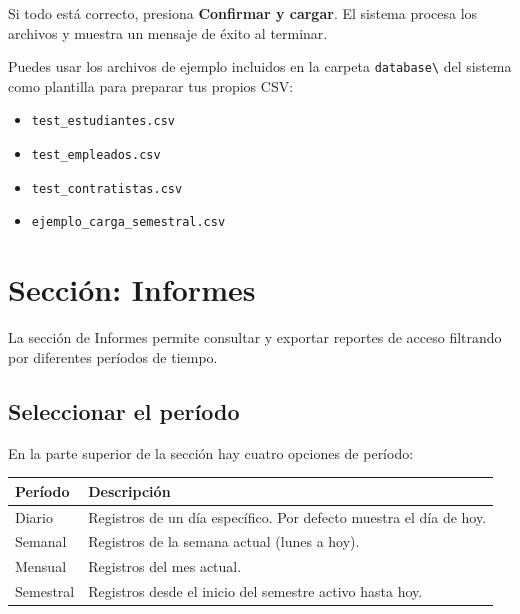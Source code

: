 \documentclass[12pt, a4paper]{article}
\begin{document}
Si todo está correcto, presiona \textbf{Confirmar y cargar}.
El sistema procesa los archivos y muestra un mensaje de éxito al terminar.

\begin{tip}
  Puedes usar los archivos de ejemplo incluidos en la carpeta
  \texttt{database\textbackslash{}} del sistema como plantilla para
  preparar tus propios CSV:
  \begin{itemize}
    \item \texttt{test\_estudiantes.csv}
    \item \texttt{test\_empleados.csv}
    \item \texttt{test\_contratistas.csv}
    \item \texttt{ejemplo\_carga\_semestral.csv}
  \end{itemize}
\end{tip}

\section{Sección: Informes}
\label{sec:informes}

La sección de Informes permite consultar y exportar reportes de
acceso filtrando por diferentes períodos de tiempo.

\subsection{Seleccionar el período}

En la parte superior de la sección hay cuatro opciones de período:

\begin{center}
\renewcommand{\arraystretch}{1.4}
\begin{tabular}{@{} p{2.5cm} p{9.5cm} @{}}
  \toprule
  \textbf{Período} & \textbf{Descripción} \\
  \midrule
  Diario    & Registros de un día específico. Por defecto muestra el día de hoy. \\
  Semanal   & Registros de la semana actual (lunes a hoy). \\
  Mensual   & Registros del mes actual. \\
  Semestral & Registros desde el inicio del semestre activo hasta hoy. \\
  \bottomrule
\end{tabular}
\end{center}
\end{document}
